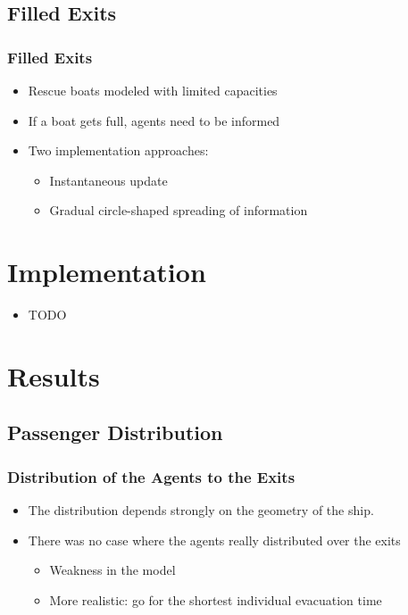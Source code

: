 \documentclass{beamer}
\begin{document}
\subsection{Filled Exits}
\begin{frame}
	\frametitle{Filled Exits}
	\begin{itemize}
		\item Rescue boats modeled with limited capacities
		\item If a boat gets full, agents need to be informed
		\item Two implementation approaches:
			\begin{itemize}
				\item Instantaneous update
				\item Gradual circle-shaped spreading of information
			\end{itemize}
	\end{itemize}
\end{frame}

\section{Implementation}

\begin{frame}
	\begin{itemize}
		\item TODO
	\end{itemize}
\end{frame}

\section{Results}

\subsection{Passenger Distribution}
\begin{frame}
	\frametitle{Distribution of the Agents to the Exits}
	\begin{itemize}
		\item The distribution depends strongly on the geometry of the ship.
		\item There was no case where the agents really distributed over the exits
		\begin{itemize}
			\item Weakness in the model
			\item More realistic: go for the shortest individual evacuation time
		\end{itemize}
	\end{itemize}
\end{frame}
\end{document}
